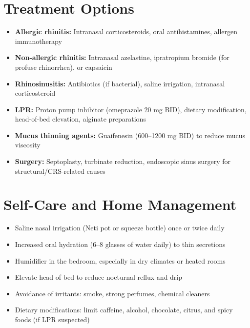 \section*{Treatment Options}
\begin{itemize}
  \item \textbf{Allergic rhinitis:} Intranasal corticosteroids, oral antihistamines, allergen immunotherapy
  \item \textbf{Non-allergic rhinitis:} Intranasal azelastine, ipratropium bromide (for profuse rhinorrhea), or capsaicin
  \item \textbf{Rhinosinusitis:} Antibiotics (if bacterial), saline irrigation, intranasal corticosteroid
  \item \textbf{LPR:} Proton pump inhibitor (omeprazole 20 mg BID), dietary modification, head-of-bed elevation, alginate preparations
  \item \textbf{Mucus thinning agents:} Guaifenesin (600--1200 mg BID) to reduce mucus viscosity
  \item \textbf{Surgery:} Septoplasty, turbinate reduction, endoscopic sinus surgery for structural/CRS-related causes
\end{itemize}

\section*{Self-Care and Home Management}
\begin{itemize}
  \item Saline nasal irrigation (Neti pot or squeeze bottle) once or twice daily
  \item Increased oral hydration (6--8 glasses of water daily) to thin secretions
  \item Humidifier in the bedroom, especially in dry climates or heated rooms
  \item Elevate head of bed to reduce nocturnal reflux and drip
  \item Avoidance of irritants: smoke, strong perfumes, chemical cleaners
  \item Dietary modifications: limit caffeine, alcohol, chocolate, citrus, and spicy foods (if LPR suspected)
\end{itemize}

